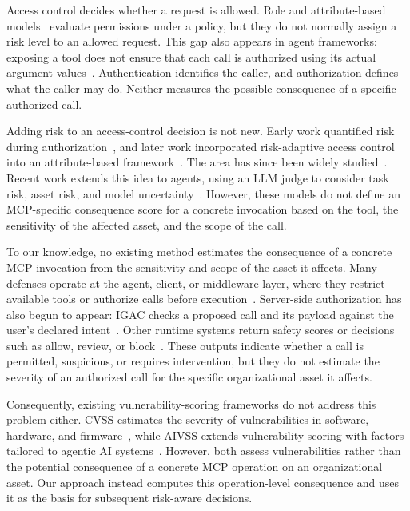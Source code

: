 \documentclass[sigconf]{acmart}
\begin{document}
Access control decides whether a request is allowed. Role and attribute-based
models~\cite{sandhu1996rbac,hu2014abac} evaluate permissions under a policy,
but they do not normally assign a risk level to an allowed request. This gap
also appears in agent frameworks: exposing a tool does not ensure that each call
is authorized using its actual argument values~\cite{mellafe2026capability}.
Authentication identifies the caller, and authorization defines what the caller
may do. Neither measures the possible consequence of a specific authorized
call.


Adding risk to an access-control decision is not new. Early work quantified risk
during authorization~\cite{cheng2007fuzzymls}, and later work incorporated
risk-adaptive access control into an attribute-based
framework~\cite{kandala2011radac}. The area has since been widely
studied~\cite{atlam2020riskbased}. Recent work extends this idea to agents,
using an LLM judge to consider task risk, asset risk, and model
uncertainty~\cite{fleming2025tbac}. However, these models do not define an
MCP-specific consequence score for a concrete invocation based on the tool, the
sensitivity of the affected asset, and the scope of the call.


To our knowledge, no existing method estimates the consequence of a concrete
MCP invocation from the sensitivity and scope of the asset it affects. Many
defenses operate at the agent, client, or middleware layer, where they restrict
available tools or authorize calls before
execution~\cite{shi2025progent,zhu2025miniscope,betser2026agentrim,
li2026conleash,abaev2026agentguardian}. Server-side authorization has also begun
to appear: IGAC checks a proposed call and its payload against the user's
declared intent~\cite{zhu2026igac}. Other runtime systems return safety scores
or decisions such as allow, review, or
block~\cite{yang2026agenttrust,zhang2026stars,hossain2026nexus}. These outputs
indicate whether a call is permitted, suspicious, or requires intervention, but
they do not estimate the severity of an authorized call for the specific
organizational asset it affects.

Consequently, existing vulnerability-scoring frameworks do not address this problem either. CVSS estimates the severity of vulnerabilities in software, hardware, and firmware~\cite{first2023cvss}, while AIVSS extends vulnerability scoring with factors tailored to agentic AI systems~\cite{huang2026aivss}. However, both assess vulnerabilities rather than the potential consequence of a concrete MCP operation on an organizational asset. Our approach instead computes this operation-level consequence and uses it as the basis for subsequent risk-aware decisions.
\end{document}
